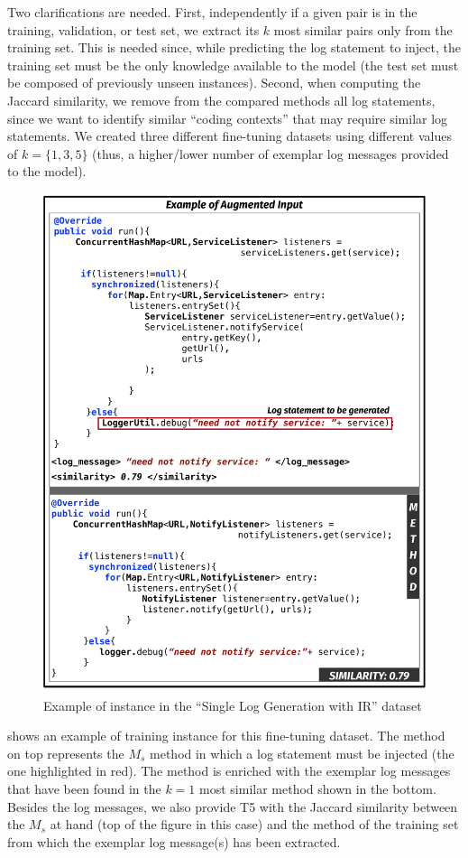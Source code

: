 Two clarifications are needed. First, independently if a given pair is in the training, validation, or test set, we extract its $k$ most similar pairs only from the training set. This is needed since, while predicting the log statement to inject, the training set must be the only knowledge available to the model (\ie the test set must be composed of previously unseen instances). Second, when computing the Jaccard similarity, we remove from the compared methods all log statements, since we want to identify similar ``coding contexts'' that may require similar log statements. We created three different fine-tuning datasets using different values of $k=\{1,3,5\}$ (thus, a higher/lower number of exemplar log messages provided to the model).

\begin{figure}[h!]
	\centering
	\includegraphics[width=0.85\columnwidth]{img/ir-example.pdf}
	\vspace{-0.2cm}
	\caption{Example of instance in the ``Single Log Generation with IR'' dataset}
	\label{fig:ir-example}
\end{figure}


 shows an example of training instance for this fine-tuning dataset. The method on top represents the $M_{s}$ \java method in which a log statement must be injected (\ie the one highlighted in red). The method is enriched with the exemplar log messages that have been found in the $k=1$ most similar method shown in the bottom. Besides the log messages, we also provide T5 with the Jaccard similarity between the $M_{s}$ at hand (top of the figure in this case) and the method of the training set from which the exemplar log message(s) has been extracted. 

